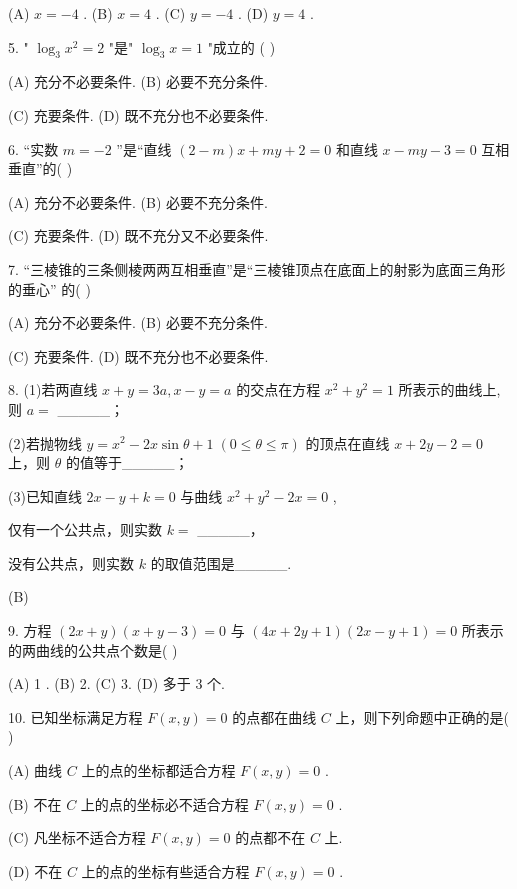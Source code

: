 \documentclass[10pt]{article}
\newcommand*\circled[1]{\tikz[baseline=(char.base)]{\node[shape=circle,draw,inner sep=1.5pt] (char) {\small #1};}}
\begin{document}
(A) \(x =  - 4\) . (B) \(x = 4\) . (C) \(y =  - 4\) . (D) \(y = 4\) .

5. " \({\log }_{3}{x}^{2} = 2\) "是" \({\log }_{3}x = 1\) "成立的 ( )

(A) 充分不必要条件. (B) 必要不充分条件.

(C) 充要条件. (D) 既不充分也不必要条件.

6. “实数 \(m =  - 2\) ”是“直线 \(\left( {2 - m}\right) x + {my} + 2 = 0\) 和直线 \(x - {my} - 3 = 0\) 互相垂直”的( )

(A) 充分不必要条件. (B) 必要不充分条件.

(C) 充要条件. (D) 既不充分又不必要条件.

7. “三棱锥的三条侧棱两两互相垂直”是“三棱锥顶点在底面上的射影为底面三角形的垂心” 的( )

(A) 充分不必要条件. (B) 必要不充分条件.

(C) 充要条件. (D) 既不充分也不必要条件.

8. (1)若两直线 \(x + y = {3a},x - y = a\) 的交点在方程 \({x}^{2} + {y}^{2} = 1\) 所表示的曲线上,则 \(a =\) \_\_\_\_\_；

(2)若抛物线 \(y = {x}^{2} - {2x}\sin \theta  + 1\;\left( {0 \leq  \theta  \leq  \pi }\right)\) 的顶点在直线 \(x + {2y} - 2 = 0\) 上，则 \(\theta\) 的值等于\_\_\_\_\_；

(3)已知直线 \({2x} - y + k = 0\) 与曲线 \({x}^{2} + {y}^{2} - {2x} = 0\) ,

 \circled{1} 仅有一个公共点，则实数 \(k =\) \_\_\_\_\_，

 \circled{2} 没有公共点，则实数 \(k\) 的取值范围是\_\_\_\_\_.

(B)

9. 方程 \(\left( {{2x} + y}\right) \left( {x + y - 3}\right)  = 0\) 与 \(\left( {{4x} + {2y} + 1}\right) \left( {{2x} - y + 1}\right)  = 0\) 所表示的两曲线的公共点个数是( )

(A) 1 . (B) 2. (C) 3. (D) 多于 3 个.

10. 已知坐标满足方程 \(F\left( {x,y}\right)  = 0\) 的点都在曲线 \(C\) 上，则下列命题中正确的是( )

(A) 曲线 \(C\) 上的点的坐标都适合方程 \(F\left( {x,y}\right)  = 0\) .

(B) 不在 \(C\) 上的点的坐标必不适合方程 \(F\left( {x,y}\right)  = 0\) .

(C) 凡坐标不适合方程 \(F\left( {x,y}\right)  = 0\) 的点都不在 \(C\) 上.

(D) 不在 \(C\) 上的点的坐标有些适合方程 \(F\left( {x,y}\right)  = 0\) .
\end{document}
